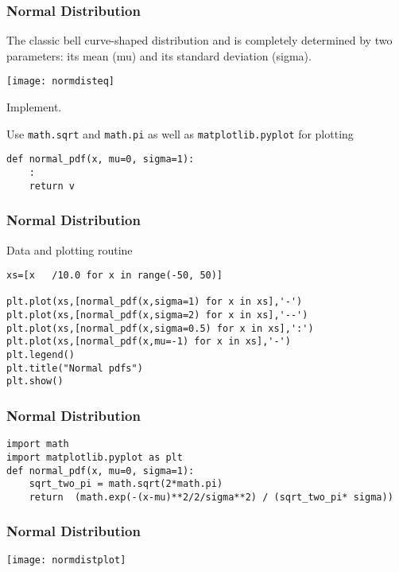 \begin{frame}[fragile]\frametitle{Normal Distribution}
The classic bell curve-shaped distribution and is completely determined by two parameters: its mean (mu) and its standard deviation	 (sigma).
\begin{center}
\texttt{[image: normdisteq]}
\end{center}
Implement. 

Use \lstinline|math.sqrt| and \lstinline|math.pi| as well as \lstinline|matplotlib.pyplot| for plotting
\begin{lstlisting}
def normal_pdf(x, mu=0, sigma=1):
	:
	return v
\end{lstlisting}
\end{frame}

\begin{frame}[fragile]\frametitle{Normal Distribution}
Data and plotting routine
\begin{lstlisting}
xs=[x	/10.0 for x in range(-50, 50)]

plt.plot(xs,[normal_pdf(x,sigma=1) for x in xs],'-')
plt.plot(xs,[normal_pdf(x,sigma=2) for x in xs],'--')
plt.plot(xs,[normal_pdf(x,sigma=0.5) for x in xs],':')
plt.plot(xs,[normal_pdf(x,mu=-1) for x in xs],'-')
plt.legend()
plt.title("Normal pdfs")
plt.show()
\end{lstlisting}
\end{frame}

\begin{frame}[fragile]\frametitle{Normal Distribution}
\begin{lstlisting}
import math
import matplotlib.pyplot as plt
def normal_pdf(x, mu=0, sigma=1):
	sqrt_two_pi = math.sqrt(2*math.pi)
	return	(math.exp(-(x-mu)**2/2/sigma**2) / (sqrt_two_pi* sigma))
\end{lstlisting}
\end{frame}

\begin{frame}[fragile]\frametitle{Normal Distribution}
\begin{center}
\texttt{[image: normdistplot]}
\end{center}
\end{frame}


